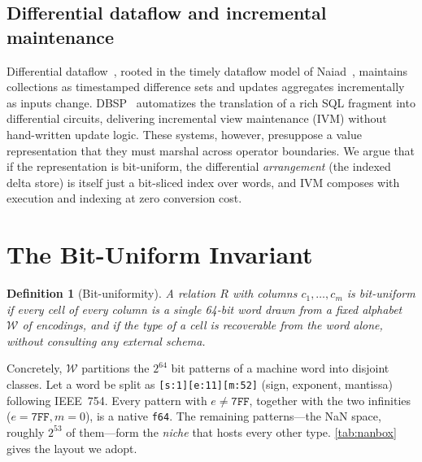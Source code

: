 \documentclass[10pt]{article}
\newtheorem{definition}{Definition}
\begin{document}
\subsection{Differential dataflow and incremental maintenance}
Differential dataflow~\citep{mcsherry2013differential}, rooted in the
timely dataflow model of Naiad~\citep{murray2013naiad}, maintains
collections as timestamped difference sets and updates aggregates
incrementally as inputs change. DBSP~\citep{budiu2023dbsp} automatizes
the translation of a rich SQL fragment into differential circuits,
delivering incremental view maintenance (IVM) without hand-written
update logic. These systems, however, presuppose a value representation
that they must marshal across operator boundaries. We argue that if the
representation is bit-uniform, the differential \emph{arrangement} (the
indexed delta store) is itself just a bit-sliced index over words, and
IVM composes with execution and indexing at zero conversion cost.

\section{The Bit-Uniform Invariant}
\label{sec:invariant}

\begin{definition}[Bit-uniformity]
\label{def:bu}
A relation $R$ with columns $c_1,\dots,c_m$ is \emph{bit-uniform} if
every cell of every column is a single 64-bit word drawn from a fixed
alphabet $\mathcal{W}$ of encodings, and if the type of a cell is
recoverable from the word alone, without consulting any external
schema.
\end{definition}

Concretely, $\mathcal{W}$ partitions the $2^{64}$ bit patterns of a
machine word into disjoint classes. Let a word be split as
\texttt{[s:1][e:11][m:52]} (sign, exponent, mantissa) following IEEE~754.
Every pattern with $e \neq \mathtt{7FF}$, together with the two
infinities ($e=\mathtt{7FF}, m=0$), is a native \texttt{f64}. The
remaining patterns---the NaN space, roughly $2^{53}$ of them---form the
\emph{niche} that hosts every other type. \cref{tab:nanbox} gives the
layout we adopt.
\end{document}
